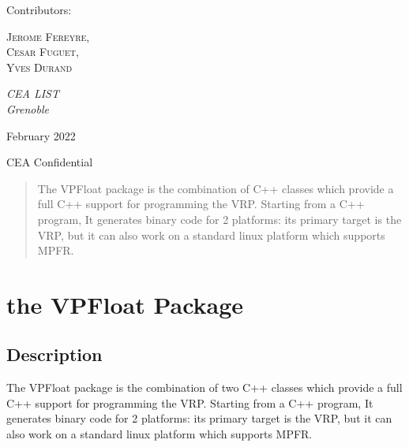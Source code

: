 \documentclass[11pt]{report}
\begin{document}
\begin{titlepage}
	Contributors:
	
	\vspace{0.5\baselineskip} %
	
	{\scshape Jerome Fereyre,\\ Cesar Fuguet,\\ Yves Durand \\} %
	
	\vspace{0.5\baselineskip} %
	
	\textit{CEA LIST \\ Grenoble} 
	
	\vfill %
	
	\vspace{0.3\baselineskip} %
	
	February 2022 %
	
	{\large CEA Confidential} %

\end{titlepage}


\begin{abstract}
  The VPFloat package is the combination of  C++ classes which provide a full C++ support for programming the VRP. Starting from a C++ program, It generates binary code for 2 platforms: its primary target is the VRP, but it can also work on a standard linux platform which supports MPFR.
\end{abstract}

\tableofcontents
\newpage

\chapter{the VPFloat Package}

\section{Description}
  The VPFloat package is the combination of two C++ classes which provide a full C++ support for programming the VRP. Starting from a C++ program, It generates binary code for 2 platforms: its primary target is the VRP, but it can also work on a standard linux platform which supports MPFR.
  
\end{document}
